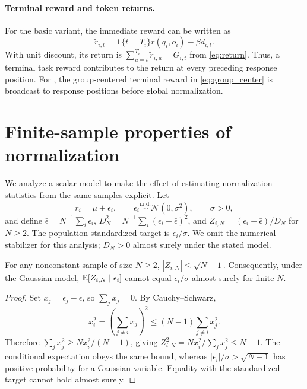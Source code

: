 \paragraph{Terminal reward and token returns.}
For the basic variant, the immediate reward can be written as
\begin{equation}
 \widetilde r_{i,t}=\mathbf{1}\{t=T_i\}r(q_i,o_i)-\beta d_{i,t}.
\end{equation}
With unit discount, its return is $\sum_{u=t}^{T_i}\widetilde r_{i,u}=G_{i,t}$ from \cref{eq:return}. Thus, a terminal task reward contributes to the return at every preceding response position. For \baseline, the group-centered terminal reward in \cref{eq:group_center} is broadcast to response positions before global normalization.

\clearpage
\section{Finite-sample properties of normalization}\label{appendix:normalization}
We analyze a scalar model to make the effect of estimating normalization statistics from the same samples explicit. Let
\begin{equation}
 r_i=\mu+\epsilon_i,\qquad \epsilon_i\overset{\mathrm{i.i.d.}}{\sim}\mathcal N(0,\sigma^2),\qquad \sigma>0,
\end{equation}
and define $\bar\epsilon=N^{-1}\sum_i\epsilon_i$,
$D_N^2=N^{-1}\sum_i(\epsilon_i-\bar\epsilon)^2$, and
$Z_{i,N}=(\epsilon_i-\bar\epsilon)/D_N$ for $N\geq2$. The population-standardized target is $\epsilon_i/\sigma$. We omit the numerical stabilizer for this analysis; $D_N>0$ almost surely under the stated model.

\begin{proposition}\label{prop:bound}
For any nonconstant sample of size $N\geq2$, $|Z_{i,N}|\leq\sqrt{N-1}$.
Consequently, under the Gaussian model, $\mathbb{E}[Z_{i,N}\mid\epsilon_i]$ cannot equal $\epsilon_i/\sigma$ almost surely for finite $N$.
\end{proposition}
\begin{proof}
Set $x_j=\epsilon_j-\bar\epsilon$, so $\sum_jx_j=0$. By Cauchy--Schwarz,
\begin{equation}
 x_i^2=\left(\sum_{j\ne i}x_j\right)^2
 \leq(N-1)\sum_{j\ne i}x_j^2.
\end{equation}
Therefore $\sum_jx_j^2\geq Nx_i^2/(N-1)$, giving
$Z_{i,N}^2=Nx_i^2/\sum_jx_j^2\leq N-1$.
The conditional expectation obeys the same bound, whereas
$|\epsilon_i|/\sigma>\sqrt{N-1}$ has positive probability for a Gaussian variable. Equality with the standardized target cannot hold almost surely.
\end{proof}

